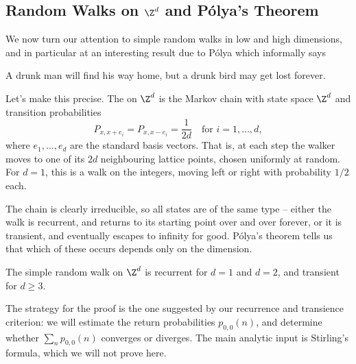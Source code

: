 \documentclass[a4paper]{scrartcl}
\begin{document}
\subsection{Random Walks on \texorpdfstring{$\Z^d$}{Zd} and Pólya's Theorem}

We now turn our attention to simple random walks in low and high dimensions, and in particular at an interesting result due to Pólya which informally says

\begin{center}
	{\color{blue} A drunk man will find his way home, but a drunk bird may get lost forever.}
\end{center}

Let's make this precise. The  on $\Z^d$ is the Markov chain with state space $\Z^d$ and transition probabilities
$$
P_{x, x + e_i} = P_{x, x - e_i} = \frac{1}{2d} \quad \text{for } i = 1, \dots, d,
$$
where $e_1, \dots, e_d$ are the standard basis vectors. That is, at each step the walker moves to one of its $2d$ neighbouring lattice points, chosen uniformly at random. For $d = 1$, this is a walk on the integers, moving left or right with probability $1/2$ each.

\begin{center}
\end{center}

The chain is clearly irreducible, so all states are of the same type -- either the walk is recurrent, and returns to its starting point over and over forever, or it is transient, and eventually escapes to infinity for good. Pólya's theorem tells us that which of these occurs depends only on the dimension.

\begin{theorem}
	The simple random walk on $\Z^d$ is recurrent for $d = 1$ and $d = 2$, and transient for $d \geq 3$.
\end{theorem}

The strategy for the proof is the one suggested by our recurrence and transience criterion: we will estimate the return probabilities $p_{0,0}(n)$, and determine whether $\sum_n p_{0, 0}(n)$ converges or diverges. The main analytic input is Stirling's formula, which we will not prove here.
\end{document}
